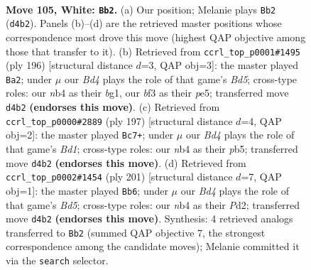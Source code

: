 \documentclass[11pt]{article}
\begin{document}
\clearpage

\begin{figure}[p]\centering
\begin{subfigure}{0.46\textwidth}\centering
\resizebox{\linewidth}{!}{%
\newchessgame
\chessboard[
  setfen={8/8/7k/8/1n1B4/5b1K/5P2/8 w - - 55 105},
  showmover=false,
  pgfstyle=straightmove, color=movearrow, markmove={d4-b2}
]}
\caption{}
\end{subfigure}\hfill
\begin{subfigure}{0.46\textwidth}\centering
\resizebox{\linewidth}{!}{%
\newchessgame
\chessboard[
  setfen={8/3k4/8/3Bp3/8/5P2/3K4/6b1 w - - 19 99},
  showmover=false,
  pgfstyle=straightmove, color=movearrow, markmove={d5-a2}
]}
\caption{}
\end{subfigure}
\\[4pt]
\begin{subfigure}{0.46\textwidth}\centering
\resizebox{\linewidth}{!}{%
\newchessgame
\chessboard[
  setfen={3b4/8/1p6/1P1B4/8/6K1/8/6k1 b - - 12 99},
  showmover=false,
  pgfstyle=straightmove, color=movearrow, markmove={d8-c7}
]}
\caption{}
\end{subfigure}\hfill
\begin{subfigure}{0.46\textwidth}\centering
\resizebox{\linewidth}{!}{%
\newchessgame
\chessboard[
  setfen={8/5K2/7k/6p1/3b4/5B2/3p4/8 b - - 75 101},
  showmover=false,
  pgfstyle=straightmove, color=movearrow, markmove={d4-b6}
]}
\caption{}
\end{subfigure}
\caption{\textbf{Move 105, White: \texttt{Bb2}.} (a) Our position; Melanie plays \texttt{Bb2} (\texttt{d4b2}). Panels (b)--(d) are the retrieved master positions whose correspondence most drove this move (highest QAP objective among those that transfer to it). (b) Retrieved from \texttt{ccrl\_top\_p0001\#1495} (ply 196) [structural distance $d$=3, QAP obj=3]: the master played \texttt{Ba2}; under $\mu$ our \emph{Bd4} plays the role of that game's \emph{Bd5}; cross-type roles: our \emph{n}b4 as their \emph{b}g1, our \emph{b}f3 as their \emph{p}e5; transferred move \texttt{d4b2} \textbf{(endorses this move)}. (c) Retrieved from \texttt{ccrl\_top\_p0000\#2889} (ply 197) [structural distance $d$=4, QAP obj=2]: the master played \texttt{Bc7+}; under $\mu$ our \emph{Bd4} plays the role of that game's \emph{Bd1}; cross-type roles: our \emph{n}b4 as their \emph{p}b5; transferred move \texttt{d4b2} \textbf{(endorses this move)}. (d) Retrieved from \texttt{ccrl\_top\_p0002\#1454} (ply 201) [structural distance $d$=7, QAP obj=1]: the master played \texttt{Bb6}; under $\mu$ our \emph{Bd4} plays the role of that game's \emph{Bd5}; cross-type roles: our \emph{n}b4 as their \emph{P}d2; transferred move \texttt{d4b2} \textbf{(endorses this move)}. Synthesis: 4 retrieved analogs transferred to \texttt{Bb2} (summed QAP objective 7, the strongest correspondence among the candidate moves); Melanie committed it via the \texttt{search} selector.}
\label{fig:thought-m208}
\end{figure}
\end{document}
